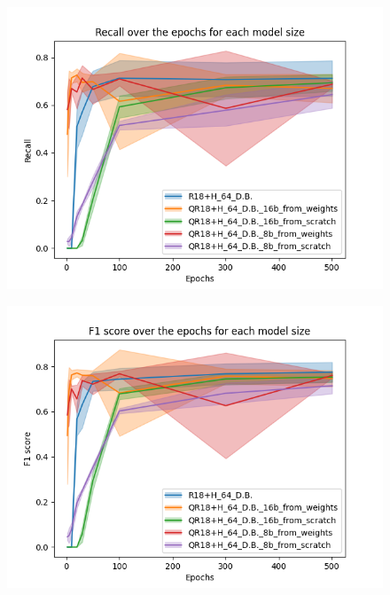 \begin{figure}[!htbp]
\begin{minipage}[t]{.5\textwidth}
      \includegraphics[width=1.1\linewidth ]{Figures/results/qresnet18+head/qr18+h_rappel_over_epochs_500.png}
      \label{fig:qresnet18+head_recall}
    \end{minipage}
\end{figure}

\begin{figure}[!htbp]
    \centering
    \begin{minipage}[t]{.5\textwidth}%
      \centering
      \includegraphics[width=1.1\linewidth]{Figures/results/qresnet18+head/qr18+h_f1_score_over_epochs_500.png}
      \label{fig:qresnet18+head_f1_score}
    \end{minipage}%
\end{figure}

